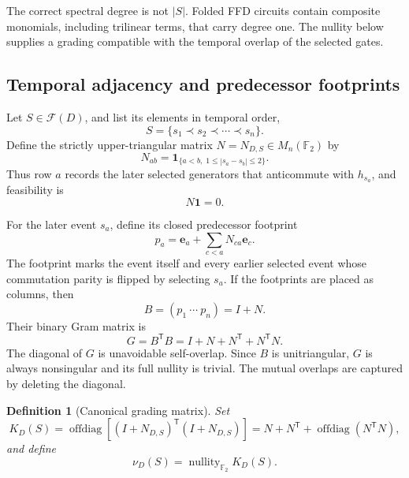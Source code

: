 \documentclass[10pt,letterpaper]{article}
\newtheorem{definition}[theorem]{Definition}
\newcommand{\Ffam}{\mathcal F}
\newcommand{\FF}{\mathbb F_2}
\newcommand{\one}{\mathbf 1}
\newcommand{\ee}{\mathbf e}
\newcommand{\nullity}{\operatorname{nullity}}
\newcommand{\offdiag}{\operatorname{offdiag}}
\begin{document}
The correct spectral degree is not \(|S|\).  Folded FFD circuits contain composite monomials, including trilinear terms, that carry degree one.  The nullity below supplies a grading compatible with the temporal overlap of the selected gates.

\subsection{Temporal adjacency and predecessor footprints}

Let \(S\in\Ffam(D)\), and list its elements in temporal order,
\[
 S=\{s_1\prec s_2\prec\cdots\prec s_n\}.
\]
Define the strictly upper-triangular matrix \(N=N_{D,S}\in M_n(\FF)\) by
\begin{equation}\label{eq:N}
 N_{ab}=\mathbf1_{\{a<b,\;1\le|s_a-s_b|\le2\}}.
\end{equation}
Thus row \(a\) records the later selected generators that anticommute with \(h_{s_a}\), and feasibility is
\begin{equation}\label{eq:N-feasible}
 N\one=0.
\end{equation}

For the later event \(s_a\), define its closed predecessor footprint
\begin{equation}\label{eq:footprint}
 p_a=\ee_a+\sum_{c<a}N_{ca}\ee_c.
\end{equation}
The footprint marks the event itself and every earlier selected event whose commutation parity is flipped by selecting \(s_a\).  If the footprints are placed as columns, then
\begin{equation}\label{eq:B}
 B=(p_1\ \cdots\ p_n)=I+N.
\end{equation}
Their binary Gram matrix is
\begin{equation}\label{eq:Gram}
 G=B^{\mathsf T}B=I+N+N^{\mathsf T}+N^{\mathsf T}N.
\end{equation}
The diagonal of \(G\) is unavoidable self-overlap.  Since \(B\) is unitriangular, \(G\) is always nonsingular and its full nullity is trivial.  The mutual overlaps are captured by deleting the diagonal.

\begin{definition}[Canonical grading matrix]\label{def:K}
Set
\begin{equation}\label{eq:K}
 K_D(S)=\offdiag\!\left[(I+N_{D,S})^{\mathsf T}(I+N_{D,S})\right]
 =N+N^{\mathsf T}+\offdiag(N^{\mathsf T}N),
\end{equation}
and define
\begin{equation}\label{eq:nu}
 \nu_D(S)=\nullity_{\FF}K_D(S).
\end{equation}
\end{definition}
\end{document}
